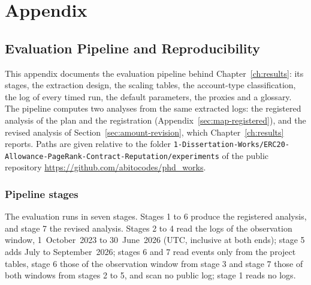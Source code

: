 \clearpage
\chapter{Appendix}
\label{ch:appendix}

\renewcommand{\dissertationSubheading}[2][]{%
  \phantomsection
  \subsection{#2}%
  \if\relax\detokenize{#1}\relax\else\label{#1}\fi
}
\renewcommand{\dissertationSubsubheading}[2][]{%
  \phantomsection
  \subsubsection{#2}%
  \if\relax\detokenize{#1}\relax\else\label{#1}\fi
}

\section{Evaluation Pipeline and Reproducibility}
\label{ch:appendix-eval}

This appendix documents the evaluation pipeline behind Chapter~\ref{ch:results}: its stages, the extraction design, the scaling tables, the account-type classification, the log of every timed run, the default parameters, the proxies and a glossary. The pipeline computes two analyses from the same extracted logs: the registered analysis of the plan and the registration (Appendix~\ref{sec:map-registered}), and the revised analysis of Section~\ref{sec:amount-revision}, which Chapter~\ref{ch:results} reports. Paths are given relative to the folder \texttt{1-Dissertation-Works/ERC20-Allowance-PageRank-Contract-Reputation/experiments} of the public repository \url{https://github.com/abitocodes/phd_works}.

\dissertationSubheading[sec:pipeline-stages]{Pipeline stages}

The evaluation runs in seven stages. Stages 1 to 6 produce the registered analysis, and stage 7 the revised analysis. Stages 2 to 4 read the logs of the observation window, 1~October~2023 to 30~June~2026 (UTC, inclusive at both ends); stage 5 adds July to September~2026; stages 6 and 7 read events only from the project tables, stage 6 those of the observation window from stage 3 and stage 7 those of both windows from stages 2 to 5, and scan no public log; stage 1 reads no logs.

